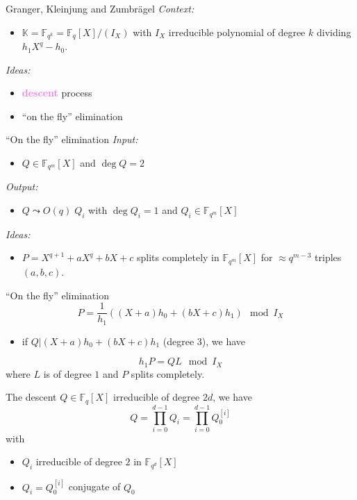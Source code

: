 \documentclass[xcolor=x11names,compress]{beamer}
\theoremstyle{break}
\theoremstyle{sc}
\theoremstyle{definition}
\theoremstyle{remark}
\begin{document}
\begin{frame}{Granger, Kleinjung and Zumbrägel}
  \emph{Context:}
  \begin{itemize}
    \item $\mathbb{K}=\mathbb{F}_{q^k} = \mathbb{F}_q[X]/(I_X)$ with
  $I_X$ irreducible polynomial of degree $k$ dividing $h_1X^q-h_0$.
  \end{itemize}
  \emph{Ideas:}
  \begin{itemize}
    \item \textcolor{violet}{\textbf{descent}} process
    \item ``on the fly'' elimination
  \end{itemize}
\end{frame}

\begin{frame}{``On the fly'' elimination}
  \emph{Input:}
  \begin{itemize}
    \item $Q\in \mathbb{F}_{q^m}[X]$ and $\deg Q = 2$
  \end{itemize}
  \emph{Output:}
  \begin{itemize}
    \item $Q\leadsto O(q)\; Q_i$ with $\deg Q_i = 1$ and $Q_i\in
      \mathbb{F}_{q^m}[X]$
  \end{itemize}

  \emph{Ideas:}
  \begin{itemize}
    \item $P = X^{q+1}+aX^q+bX+c$ splits completely
  in $\mathbb{F}_{q^m}[X]$ for  $\approx q^{m-3}$ triples $(a, b, c)$.
  \end{itemize}
\end{frame}

\begin{frame}{``On the fly'' elimination}
  \[
    P = \frac{1}{h_1}((X+a)h_0 + (bX+c)h_1)\mod I_X
  \]
  \begin{itemize}
    \item if $Q| (X+a)h_0 + (bX+c)h_1$ (degree $3$), we have 
  \end{itemize}
  \[
    h_1P=QL \mod I_X
  \]
  where $L$ is of degree $1$ and $P$ splits completely.

\end{frame}

\begin{frame}{The descent}
  $Q\in\mathbb{F}_{q}[X]$ irreducible of degree $2d$, we have
  \[
    Q=\prod_{i=0}^{d-1} Q_i = \prod_{i=0}^{d-1}Q_0^{[i]}
  \]
  with 
  \begin{itemize}
    \item $Q_i$ irreducible of degree $2$ in $\mathbb{F}_{q^d}[X]$ 
    \item $Q_i=Q_0^{[i]}$ conjugate of $Q_0$
  \end{itemize}
\end{frame}
  
\end{document}

